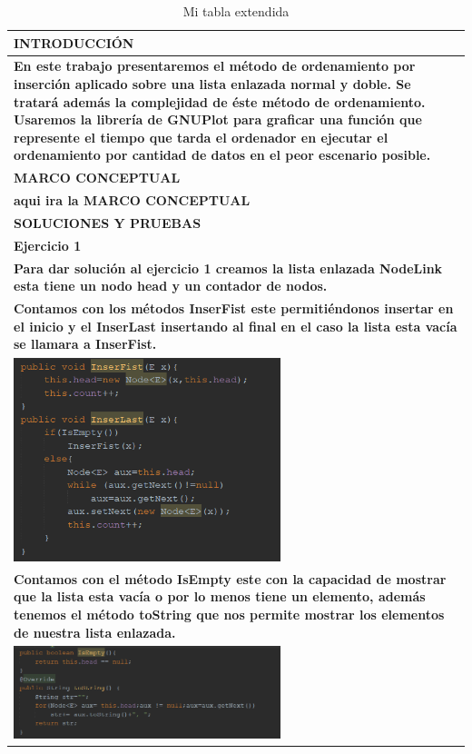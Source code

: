 \documentclass[9pt]{article}
\begin{document}
	\begin{longtable}{|p{15cm}|}
		\caption{Mi tabla extendida}\\
		\hline 
		\rowcolor{tablebackground}
		\color{white}\textbf{INTRODUCCIÓN}  \\
		\hline 
		\textbf{En este trabajo presentaremos el método de ordenamiento por inserción aplicado sobre una lista enlazada normal y doble. Se tratará además la complejidad de éste método de ordenamiento. Usaremos la librería de GNUPlot para graficar una función que represente el tiempo que tarda el ordenador en ejecutar el ordenamiento por cantidad de datos en el peor escenario posible.}  \\
		\hline 
		\rowcolor{tablebackground}
		\color{white}\textbf{MARCO CONCEPTUAL}  \\
		\hline 
		\textbf{aqui ira la MARCO CONCEPTUAL}  \\
		\hline 
		\rowcolor{tablebackground}
		\color{white}\textbf{SOLUCIONES Y PRUEBAS}  \\
		\hline 
		\textbf{Ejercicio 1}  \\
		\textbf{Para dar solución al ejercicio 1 creamos la lista enlazada NodeLink esta tiene un nodo head y un contador de nodos.}  \\
		\textbf{Contamos con los métodos InserFist este permitiéndonos insertar en el inicio y el InserLast insertando al final en el caso la lista esta vacía se llamara a InserFist.}  \\
		\includegraphics[width=0.6\textwidth,keepaspectratio]{img/insertar.png}\\
		\textbf{Contamos con el método IsEmpty este con la capacidad de mostrar que la lista esta vacía o por lo menos tiene un elemento, además tenemos el método toString que nos permite mostrar los elementos de nuestra lista enlazada.}\\
		\includegraphics[width=0.6\textwidth,keepaspectratio]{img/verificar.png}\\

\end{longtable}
\end{document}
